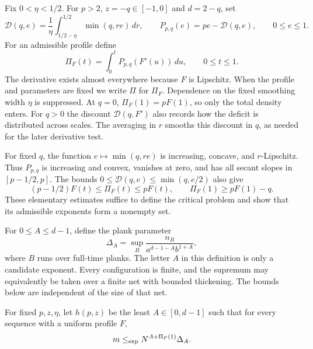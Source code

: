 Fix $0<\eta<1/2$.  For $p>2$, $z=-q\in[-1,0]$ and $d=2-q$, set
\begin{equation}\label{eq:temporal-integrand}
 \mathcal D(q,e)=\frac1\eta\int_{1/2-\eta}^{1/2}\min(q,re)\,dr,
 \qquad P_{p,q}(e)=pe-\mathcal D(q,e),\qquad 0\le e\le1.
\end{equation}
For an admissible profile define
\begin{equation}\label{eq:temporal-cost}
 \Pi_F(t)=\int_0^t P_{p,q}(F'(u))\,du,
 \qquad 0\le t\le1.
\end{equation}
The derivative exists almost everywhere because $F$ is Lipschitz.  When the
profile and parameters are fixed we write $\Pi$ for $\Pi_F$.  Dependence on
the fixed smoothing width $\eta$ is suppressed. At $q=0$,
$\Pi_F(1)=pF(1)$, so only the total density enters. For $q>0$ the
discount $\mathcal D(q,F')$ also records how the deficit is distributed
across scales. The averaging in $r$ smooths this discount in $q$, as needed for
the later derivative test.

For fixed $q$, the function $e\mapsto\min(q,re)$ is increasing, concave,
and $r$-Lipschitz. Thus $P_{p,q}$ is increasing and convex, vanishes at
zero, and has all secant slopes in $[p-1/2,p]$. The bounds
$0\le\mathcal D(q,e)\le\min(q,e/2)$ also give
\begin{equation}\label{eq:cost-elementary-bounds}
 (p-1/2)F(t)\le\Pi_F(t)\le pF(t),
 \qquad \Pi_F(1)\ge pF(1)-q.
\end{equation}
These elementary estimates suffice to define the critical problem and
show that its admissible exponents form a nonempty set.

For $0\le A\le d-1$, define the plank parameter
\begin{equation}\label{eq:plank-parameter}
 \Delta_A=\sup_B\frac{n_B}{a^{d-1-A}b^{1+A}},
\end{equation}
where $B$ runs over full-time planks.  The letter $A$ in this definition is
only a candidate exponent.  Every configuration is finite, and the
supremum may equivalently be taken over a finite net with bounded
thickening.  The bounds below are independent of the size of that net.

\begin{definition}\label{def:critical}
For fixed $p,z,\eta$, let $h(p,z)$ be the least $A\in[0,d-1]$ such that
for every sequence with a uniform profile $F$,
\begin{equation}\label{eq:critical-bound}
 m\mathrel{\leq_{\mathrm{exp}}} N^{A+\Pi_F(1)}\Delta_A.
\end{equation}
\end{definition}


